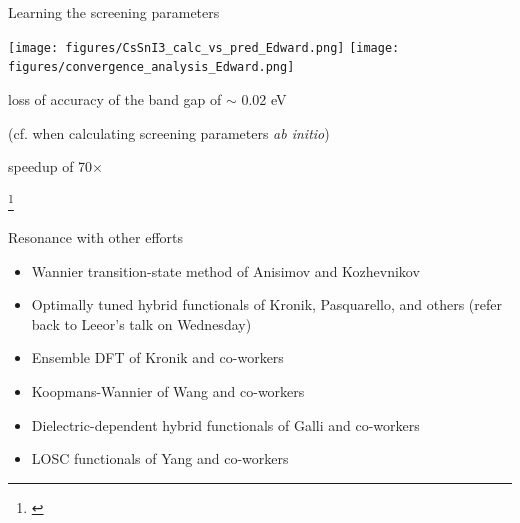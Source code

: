 \documentclass[xcolor=table,aspectratio=169]{beamer}
\newcommand\blfootcite[1]{%
  \begingroup
  \renewcommand\thefootnote{}\footnote{\hspace{-4ex}\cite{#1}}%
  \addtocounter{footnote}{-1}%
  \endgroup
}
\numberwithin{equation}{section}
\newcommand{\backupend}{
   \setcounter{framenumber}{\value{finalframe}}
}
\begin{document}
\begin{frame}{Learning the screening parameters}
   \begin{center}

      \texttt{[image: figures/CsSnI3\_calc\_vs\_pred\_Edward.png]}
      \texttt{[image: figures/convergence\_analysis\_Edward.png]}

      loss of accuracy of the band gap of $\sim$ 0.02 eV

      (cf. when calculating screening parameters \emph{ab initio})

      speedup of 70$\times$
   \end{center}

   \blfootcite{Schubert2022}

\end{frame}

\begin{frame}{Resonance with other efforts}
   \begin{itemize}
      \item Wannier transition-state method of Anisimov and Kozhevnikov \cite{Anisimov2005}
      \item Optimally tuned hybrid functionals of Kronik, Pasquarello, and others (refer back to Leeor's talk on Wednesday) \cite{Kronik2012,Wing2021}
      \item Ensemble DFT of Kronik and co-workers \cite{Kraisler2013}
      \item Koopmans-Wannier of Wang and co-workers \cite{Ma2016}
      \item Dielectric-dependent hybrid functionals of Galli and co-workers \cite{Skone2016a}
      \item LOSC functionals of Yang and co-workers \cite{Li2018}
   \end{itemize}
\end{frame}




\backupend
\end{document}
